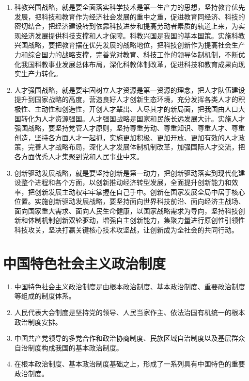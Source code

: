 \documentclass[12pt, a4paper, oneside]{ctexbook}
\begin{document}
\begin{enumerate}
\item 科教兴国战略，就是要全面落实科学技术是第一生产力的思想，坚持教育优先发展，把科技和教育作为经济社会发展的重中之重，促进教育同经济、科技的密切结合，把经济建设转到依靠科技进步和提高劳动者素质的轨道上来，为实现经济发展提供科技支撑和人才保障。科教兴国是我国的基本国策。实施科教兴国战略，要把教育摆在优先发展的战略地位，把科技创新作为提高社会生产力和综合国力的战略支撑，完善党对教育、科技工作的领导体制机制，不断优化我国科教事业发展总体布局，深化科教体制改革，促进科技和教育成果向现实生产力转化。

\item 人才强国战略，就是要牢固树立人才资源是第一资源的理念，把人才队伍建设提升到国家战略的高度，营造良好人才创新生态环境，充分发挥各类人才的积极性、主动性和创造性，开创人才辈出、人尽其才的新局面，把我国由人口大国转化为人才资源强国。人才强国战略是国家和民族长远发展大计。实施人才强国战略，要坚持党管人才原则，坚持尊重劳动、尊重知识、尊重人才、尊重创造，坚持各方面人才一起抓，实施更加积极、更加开放、更加有效的人才政策，完善人才战略布局，深化人才发展体制机制改革，加强国际人才交流，把各方面优秀人才集聚到党和人民事业中来。

\item 创新驱动发展战略，就是要坚持创新是第一动力，把创新驱动落实到现代化建设整个进程和各个方面，以创新推动经济转型发展，全面提升创新能力和效率，把创新发展主动权牢牢掌握在自己手中。创新在国家发展全局中居于核心位置。实施创新驱动发展战略，要坚持面向世界科技前沿、面向经济主战场、面向国家重大需求、面向人民生命健康，以国家战略需求为导向，坚持科技创新和体制机制创新双轮驱动，增强自主创新能力，集聚力量进行原创性引领性科技攻关，坚决打赢关键核心技术攻坚战，让创新成为全社会的共同行动。
\end{enumerate}

\section{中国特色社会主义政治制度}

\begin{enumerate}
\item 中国特色社会主义政治制度是由根本政治制度、基本政治制度、重要政治制度等组成的制度体系。

\item 人民代表大会制度是坚持党的领导、人民当家作主、依法治国有机统一的根本政治制度安排。

\item 中国共产党领导的多党合作和政治协商制度、民族区域自治制度以及基层群众自治制度构成我国的基本政治制度。

\item 在根本政治制度、基本政治制度基础之上，形成了一系列具有中国特色的重要政治制度。
\end{enumerate}
\end{document}
